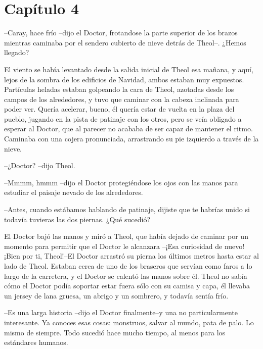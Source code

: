 \chapter*{Capítulo 4}

--Caray, hace frío --dijo el Doctor, frotandose la parte superior de los brazos mientras caminaba por el sendero cubierto de nieve detrás de Theol--. ¿Hemos llegado?



El viento se había levantado desde la salida inicial de Theol esa mañana, y aquí, lejos de la sombra de los edificios de Navidad, ambos estaban muy expuestos. Partículas heladas estaban golpeando la cara de Theol, azotadas desde los campos de los alrededores, y tuvo que caminar con la cabeza inclinada para poder ver. Quería acelerar, bueno, él quería estar de vuelta en la plaza del pueblo, jugando en la pista de patinaje con los otros, pero se veía obligado a esperar al Doctor, que al parecer no acababa de ser capaz de mantener el ritmo. Caminaba con una cojera pronunciada, arrastrando su pie izquierdo a través de la nieve.



--¿Doctor? --dijo Theol.



--Mmmm, hmmm --dijo el Doctor protegiéndose los ojos con las manos para estudiar el paisaje nevado de los alrededores.



--Antes, cuando estábamos hablando de patinaje, dijiste que te habrías unido si todavía tuvieras las dos piernas. ¿Qué sucedió?



El Doctor bajó las manos y miró a Theol, que había dejado de caminar por un momento para permitir que el Doctor le alcanzara --¡Esa curiosidad de nuevo! ¡Bien por ti, Theol!--El Doctor arrastró su pierna los últimos metros hasta estar al lado de Theol. Estaban cerca de uno de los braseros que servían como faros a lo largo de la carretera, y el Doctor se calentó las manos sobre él. Theol no sabía cómo el Doctor podía soportar estar fuera sólo con su camisa y capa, él llevaba un jersey de lana gruesa, un abrigo y un sombrero, y todavía sentía frío.



--Es una larga historia --dijo el Doctor finalmente--y una no particularmente interesante. Ya conoces esas cosas: monstruos, salvar al mundo, pata de palo. Lo mismo de siempre. Todo sucedió hace mucho tiempo, al menos para los estándares humanos.




